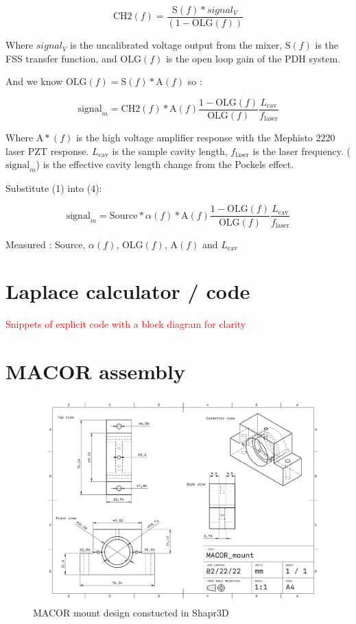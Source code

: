 \begin{equation}
\mathrm{CH2}(f) = \frac{\mathrm{S}(f)*signal_V}{(1-\mathrm{OLG}(f))}
\end{equation}

Where $signal_V$ is the uncalibrated voltage output from the mixer, $\mathrm{S}(f)$ is the FSS transfer function, and $\mathrm{OLG}(f)$ is the open loop gain of the PDH system.

And we know $\mathrm{OLG}(f) = \mathrm{S}(f)*\mathrm{A}(f)$ so :

\begin{equation}
\mathrm{signal}_m = \mathrm{CH2}(f)*\mathrm{A}(f) \frac{1-\mathrm{OLG}(f)}{\mathrm{OLG}(f)} \frac{L_\mathrm{cav}}{f_\mathrm{laser}}
\end{equation}

Where $\mathrm{A}*(f)$ is the high voltage amplifier response with the Mephisto 2220 laser PZT response. $L_\mathrm{cav}$ is the sample cavity length, $f_\mathrm{laser}$ is the laser frequency. ($\mathrm{signal}_m$)  is the effective cavity length change from the Pockels effect.

Substitute (1) into (4):

\begin{equation}
\mathrm{signal}_m = \mathrm{Source} * \alpha(f) * \mathrm{A}(f) \frac{1-\mathrm{OLG}(f)}{\mathrm{OLG}(f)} \frac{L_\mathrm{cav}}{f_\mathrm{laser}}
\end{equation}

Measured :
Source, $\alpha (f)$, OLG$(f)$, A$(f)$ and $L_\mathrm{cav}$

\section{Laplace calculator / code}

\textcolor{red}{Snippets of explicit code with a block diagram for clarity}

\section{MACOR assembly}

\begin{figure}[H]
\includegraphics[width=\textwidth]{figs/ALGAAS/MACOR_mount.pdf}
\caption{MACOR mount design constucted in Shapr3D}
\label{fig:macor_mount_design}
\end{figure}

